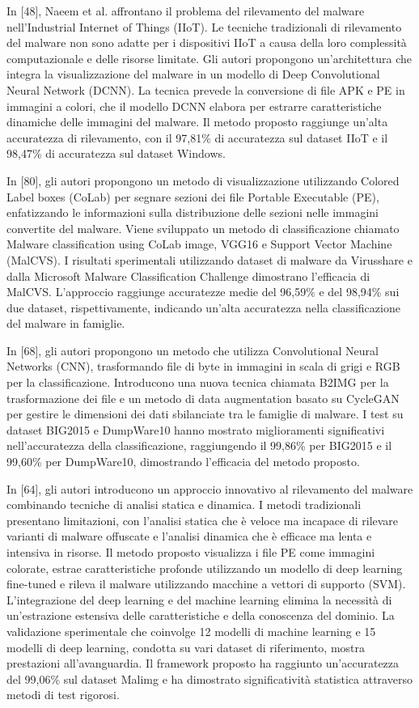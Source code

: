 In [48], Naeem et al. affrontano il problema del rilevamento del malware nell'Industrial Internet of Things (IIoT). Le tecniche tradizionali di rilevamento del malware non sono adatte per i dispositivi IIoT a causa della loro complessità computazionale e delle risorse limitate. Gli autori propongono un'architettura che integra la visualizzazione del malware in un modello di Deep Convolutional Neural Network (DCNN). La tecnica prevede la conversione di file APK e PE in immagini a colori, che il modello DCNN elabora per estrarre caratteristiche dinamiche delle immagini del malware. Il metodo proposto raggiunge un'alta accuratezza di rilevamento, con il 97,81\% di accuratezza sul dataset IIoT e il 98,47\% di accuratezza sul dataset Windows.

In [80], gli autori propongono un metodo di visualizzazione utilizzando Colored Label boxes (CoLab) per segnare sezioni dei file Portable Executable (PE), enfatizzando le informazioni sulla distribuzione delle sezioni nelle immagini convertite del malware. Viene sviluppato un metodo di classificazione chiamato Malware classification using CoLab image, VGG16 e Support Vector Machine (MalCVS). I risultati sperimentali utilizzando dataset di malware da Virusshare e dalla Microsoft Malware Classification Challenge dimostrano l'efficacia di MalCVS. L'approccio raggiunge accuratezze medie del 96,59\% e del 98,94\% sui due dataset, rispettivamente, indicando un'alta accuratezza nella classificazione del malware in famiglie.

In [68], gli autori propongono un metodo che utilizza Convolutional Neural Networks (CNN), trasformando file di byte in immagini in scala di grigi e RGB per la classificazione. Introducono una nuova tecnica chiamata B2IMG per la trasformazione dei file e un metodo di data augmentation basato su CycleGAN per gestire le dimensioni dei dati sbilanciate tra le famiglie di malware. I test su dataset BIG2015 e DumpWare10 hanno mostrato miglioramenti significativi nell'accuratezza della classificazione, raggiungendo il 99,86\% per BIG2015 e il 99,60\% per DumpWare10, dimostrando l'efficacia del metodo proposto.

In [64], gli autori introducono un approccio innovativo al rilevamento del malware combinando tecniche di analisi statica e dinamica. I metodi tradizionali presentano limitazioni, con l'analisi statica che è veloce ma incapace di rilevare varianti di malware offuscate e l'analisi dinamica che è efficace ma lenta e intensiva in risorse. Il metodo proposto visualizza i file PE come immagini colorate, estrae caratteristiche profonde utilizzando un modello di deep learning fine-tuned e rileva il malware utilizzando macchine a vettori di supporto (SVM). L'integrazione del deep learning e del machine learning elimina la necessità di un'estrazione estensiva delle caratteristiche e della conoscenza del dominio. La validazione sperimentale che coinvolge 12 modelli di machine learning e 15 modelli di deep learning, condotta su vari dataset di riferimento, mostra prestazioni all'avanguardia. Il framework proposto ha raggiunto un'accuratezza del 99,06\% sul dataset Malimg e ha dimostrato significatività statistica attraverso metodi di test rigorosi.

